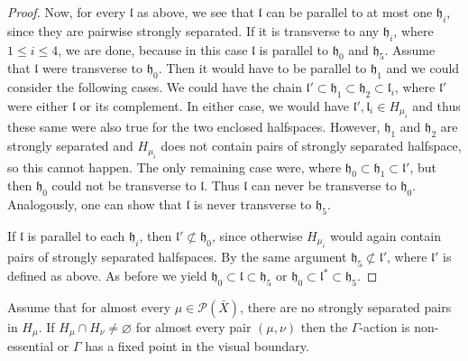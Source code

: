 \begin{proof}
  Now, for every \(\mathfrak{l}\) as above, we see that \(\mathfrak{l}\) can be parallel to at most one \(\mathfrak{h}_i\), since they are pairwise strongly separated. If it is transverse to any \(\mathfrak{h}_i\), where \(1 \leq i \leq 4\), we are done, because in this case \(\mathfrak{l}\) is parallel to \(\mathfrak{h}_0\) and \(\mathfrak{h}_5\). Assume that \(\mathfrak{l}\) were transverse to \(\mathfrak{h}_0\). Then it would have to be parallel to \(\mathfrak{h}_1\) and we could consider the following cases. We could have the chain \(\mathfrak{l}' \subset \mathfrak{h}_1 \subset \mathfrak{h}_2 \subset \mathfrak{l}_i\), where \(\mathfrak{l}'\) were either \(\mathfrak{l}\) or its complement. In either case, we would have \(\mathfrak{l}', \mathfrak{l}_i \in H_{\mu_i}\) and thus these same were also true for the two enclosed halfspaces. However, \(\mathfrak{h}_1\) and \(\mathfrak{h}_2\) are strongly separated and \(H_{\mu_i}\) does not contain pairs of strongly separated halfspace, so this cannot happen. The only remaining case were, where \(\mathfrak{h_0} \subset \mathfrak{h}_1 \subset \mathfrak{l}'\), but then \(\mathfrak{h}_0\) could not be transverse to \(\mathfrak{l}\). Thus \(\mathfrak{l}\) can never be transverse to \(\mathfrak{h}_0\). Analogously, one can show that \(\mathfrak{l}\) is never transverse to \(\mathfrak{h}_5\).

  If \(\mathfrak{l}\) is parallel to each \(\mathfrak{h}_i\), then \(\mathfrak{l}' \not\subset \mathfrak{h_0}\), since otherwise \(H_{\mu_i}\) would again contain pairs of strongly separated halfspaces. By the same argument \(\mathfrak{h}_5 \not\subset \mathfrak{l}'\), where \(\mathfrak{l}'\) is defined as above. As before we yield \(\mathfrak{h}_0 \subset \mathfrak{l} \subset \mathfrak{h}_5\) or \(\mathfrak{h}_0 \subset \mathfrak{l}^\ast \subset \mathfrak{h}_5\).
\end{proof}

\begin{cor}[{\cite[Corollary~4.21]{MR3509968}}]
  \label{cor:4.21}
  Assume that for almost every \(\mu \in \mathcal{P}(\bar X)\), there are no strongly separated pairs in \(H_\mu\). If \(H_\mu \cap H_\nu \neq \varnothing\) for almost every pair \((\mu, \nu)\) then the \(\Gamma\)-action is non-essential or \(\Gamma\) has a fixed point in the visual boundary.
\end{cor}

